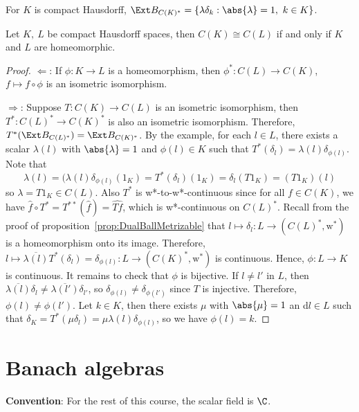 \documentclass[a4paper]{article}
\begin{document}
\begin{eg}
For $K$ is compact Hausdorff, $\Ext B_{C(K)^*}=\{\lambda\delta_k:\abs{\lambda}=1,\ k\in K\}$.
\end{eg}

\begin{nthm}\label{thm:BanachStone}
  Let $K,\ L$ be compact Hausdorff spaces, then $C(K)\cong C(L)$ if and only if $K$ and $L$ are homeomorphic.
\end{nthm}

\begin{proof}
	$\Longleftarrow$: If $\phi:K\to L$ is a homeomorphism, then $\phi^*:C(L)\to C(K)$, $f\mapsto f\circ\phi$ is an isometric isomorphism.

	$\Longrightarrow$: Suppose $T:C(K)\to C(L)$ is an isometric isomorphism, then $T^*:C(L)^*\to C(K)^*$ is also an isometric isomorphism. Therefore, $T^*(\Ext B_{C(L)^*})=\Ext B_{C(K)^*}$. By the example, for each $l\in L$, there exists a scalar $\lambda(l)$ with $\abs{\lambda}=1$ and $\phi(l)\in K$ such that $T^*(\delta_l)=\lambda(l)\delta_{\phi(l)}$. Note that
	\[
	 \lambda(l)=(\lambda(l)\delta_{\phi(l)}(1_K)=T^*(\delta_l)(1_K)=\delta_l(T1_K)=(T1_K)(l)
	\]
	so $\lambda=T1_K\in C(L)$. Also $T^*$ is w*-to-w*-continuous since for all $f\in C(K)$, we have $\hat{f}\circ T^*=T^{**}(\hat{f})=\widehat{Tf}$, which is w*-continuous on $C(L)^*$. Recall from the proof of proposition~\ref{prop:DualBallMetrizable} that $l\mapsto\delta_l:L\to (C(L)^*,\mathrm{w^*})$ is a homeomorphism onto its image. Therefore, $l\mapsto\overline{\lambda(l)}T^*(\delta_l)=\delta_{\phi(l)}:L\to (C(K)^*,\mathrm{w^*})$ is continuous. Hence, $\phi:L\to K$ is continuous. It remains to check that $\phi$ is bijective. If $l\not= l'$ in $L$, then $\overline{\lambda(l)}\delta_l\not=\overline{\lambda(l')}\delta_{l'}$, so $\delta_{\phi(l)}\not=\delta_{\phi(l')}$ since $T$ is injective. Therefore, $\phi(l)\not=\phi(l')$. Let $k\in K$, then there exists $\mu$ with $\abs{\mu}=1$ an d$l\in L$ such that $\delta_K=T^*(\mu\delta_l)=\mu\lambda(l)\delta_{\phi(l)}$, so we have $\phi(l)=k$.
\end{proof}

\newpage

\section{Banach algebras}

{\bf Convention}: For the rest of this course, the scalar field is $\C$.
\vspace{1ex}
\end{document}
